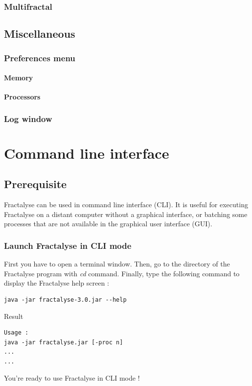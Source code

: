 \documentclass[a4paper,10pt]{report}
\begin{document}
\section{Multifractal}

\chapter{Miscellaneous}
\section{Preferences menu}
\subsection{Memory}

\subsection{Processors}

\section{Log window}



\part{Command line interface}

\chapter{Prerequisite}

Fractalyse can be used in command line interface (CLI).
It is useful for executing Fractalyse on a distant computer without a graphical interface, or batching some processes that are not available in the graphical user interface (GUI).

\section{Launch Fractalyse in CLI mode}
First you have to open a terminal window.
Then, go to the directory of the Fractalyse program with \textit{cd} command.
Finally, type the following command to display the Fractalyse help screen :
\begin{Verbatim}
java -jar fractalyse-3.0.jar --help
\end{Verbatim}
Result
\begin{Verbatim}
Usage :
java -jar fractalyse.jar [-proc n]
...
...
\end{Verbatim}
You're ready to use Fractalyse in CLI mode !
\end{document}
